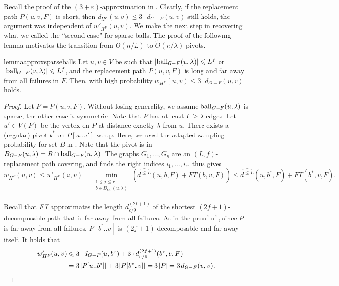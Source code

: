\documentclass{theoretics}
\newcommand*{\Otilde}{\widetilde{O}}
\newcommand*{\length}[1]{|#1|}
\newcommand*{\ball}{\mbox{\rm ball}}
\newcommand*{\nwspace}{\hspace*{.1em}}
\renewcommand{\le}{\leqslant}
\renewcommand{\ge}{\geqslant}
\newcommand{\eps}{\varepsilon}
\begin{document}
Recall the proof of the $(3{+}\varepsilon)$-approximation 
in .
Clearly, if the replacement path $P(u,v,F)$ is short,
then $d_{H^F}(u,v) \le 3 \cdot d_{G-F}(u,v)$ still holds,
the argument was independent of $w'_{H^F}(u,v)$.
We make the next step in recovering what we called the ``second case'' for sparse balls.
The proof of the following lemma motivates the transition from $\Otilde(n/L)$ to $\Otilde(n/\lambda)$ pivots.

\begin{restatable}{lemma}{approxsparseballs}
\label{lem:approx_sparse_balls}
	Let $u,v \in V$ be such that $|\ball_{G-F}(u,\lambda)| \le L^f$
	or $|\ball_{G-F}(v,\lambda)| \le L^f$, and the replacement path $P(u,v,F)$
	is long and far away from all failures in $F$.
	Then, with high probability $w_{H^F}(u,v) \le 3 \cdot d_{G-F}(u,v)$ holds.
\end{restatable}

\begin{proof}
  Let $P = P(u,v,F)$.
  Without losing generality, we assume $\ball_{G-F}(u,\lambda)$ is sparse,
  the other case is symmetric.
  Note that $P$ has at least $L \ge \lambda$ edges.
  Let $u' \in V(P)$ be the vertex on $P$ at distance exactly $\lambda$ from $u$.
  There exists a (regular) pivot $b^*$ on $P[u..u']$ w.h.p.
  Here, we used the adapted sampling probability for set $B$ in .
  Note that the pivot is in $B_{G-F}(u,\lambda) = B \cap \ball_{G-F}(u,\lambda)$.
  The graphs $G_1, \dots, G_\kappa$ are an $(L,f)$-replacement path covering,
  and  finds the right indices $i_1, \dots, i_r$.
   thus gives
  \begin{equation*}
    w_{H^F}(u,v) \le w'_{H^F}(u,v) 
    	 = \min_{
		\substack{
			1\le j \le r \\
			b \in B_{G_{i_j}}(u,\lambda)} 
		}\left(\widehat{d^{\le L}}(u,b,F) + FT(b,v,F)\right)
    	\le \widehat{d^{\le L}}(u,b^*,F) + FT(b^*,v,F).
  \end{equation*}
  
  Recall that \emph{FT} approximates the length $d^{(2f+1)}_{\eps/9}$
  of the shortest $(2f{+}1)$-decomposable path that is far away from all failures.
  As in the proof of , since $P$ is far away from all failures,
  $P[b^*..v]$ is $(2f{+}1)$-decomposable and far away itself.
  It holds that
  \begin{align*}
     w'_{H^F}(u,v) &\le 3 \cdot d_{G-F}(u,b^*)
        + 3 \cdot d^{(2f+1)}_{\eps/9}(b^*,v,F)\\
      &= 3 \nwspace \length{P[u..b^*]}
        + 3 \nwspace \length{P[b^*..v]} = 3 \nwspace |P|
      = 3 \nwspace d_{G-F}(u,v). \qedhere
  \end{align*}  
\end{proof}
\end{document}
